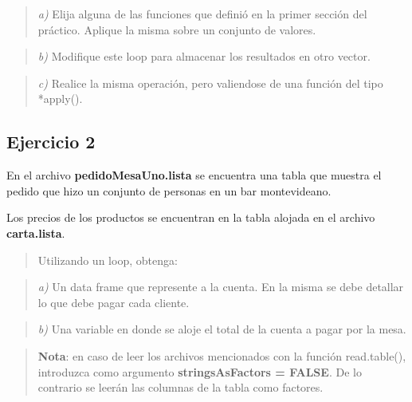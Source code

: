 \documentclass[]{article}
\begin{document}
\begin{quote}
\emph{a)} Elija alguna de las funciones que definió en la primer sección
del práctico. Aplique la misma sobre un conjunto de valores.
\end{quote}

\begin{quote}
\emph{b)} Modifique este loop para almacenar los resultados en otro
vector.
\end{quote}

\begin{quote}
\emph{c)} Realice la misma operación, pero valiendose de una función del
tipo *apply().
\end{quote}

\hypertarget{ejercicio-2-1}{%
\subsection{Ejercicio 2}\label{ejercicio-2-1}}

En el archivo \textbf{pedidoMesaUno.lista} se encuentra una tabla que
muestra el pedido que hizo un conjunto de personas en un bar
montevideano.

Los precios de los productos se encuentran en la tabla alojada en el
archivo \textbf{carta.lista}.

\begin{quote}
Utilizando un loop, obtenga:
\end{quote}

\begin{quote}
\emph{a)} Un data frame que represente a la cuenta. En la misma se debe
detallar lo que debe pagar cada cliente.
\end{quote}

\begin{quote}
\emph{b)} Una variable en donde se aloje el total de la cuenta a pagar
por la mesa.
\end{quote}

\begin{quote}
\textbf{Nota}: en caso de leer los archivos mencionados con la función
read.table(), introduzca como argumento \textbf{stringsAsFactors =
FALSE}. De lo contrario se leerán las columnas de la tabla como
factores.
\end{quote}
\end{document}
